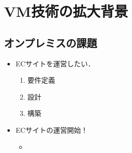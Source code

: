 \section{VM技術の拡大背景}
\subsection{オンプレミスの課題}
\begin{frame}[t]{\ftitle}
    \begin{itemize}
        \item ECサイトを運営したい．
              \begin{enumerate}
                  \item 要件定義
                  \item 設計
                  \item 構築
              \end{enumerate}
        \item ECサイトの運営開始！
              \begin{itemize}
                  \item
              \end{itemize}
    \end{itemize}
\end{frame}